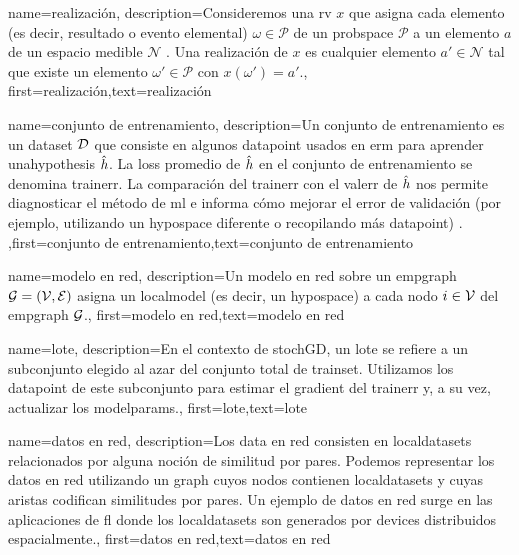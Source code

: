 	
 {name={realización},
	 description={Consideremos una \gls{rv} $x$ que asigna cada elemento 
	 (es decir, resultado o evento elemental) $\omega \in \mathcal{P}$ de un \gls{probspace} $\mathcal{P}$ 
	 a un elemento $a$ de un espacio medible $\mathcal{N}$ \cite{BillingsleyProbMeasure,RudinBookPrinciplesMatheAnalysis,HalmosMeasure}. 
	 Una realización de $x$ es cualquier elemento $a' \in \mathcal{N}$ tal que existe 
	 un elemento $\omega' \in \mathcal{P}$ con $x(\omega') = a'$.}, first={realización},text={realización}  }
 
 {name={conjunto de entrenamiento},
 description={Un conjunto de entrenamiento es un \gls{dataset} $\mathcal{D}$ que consiste en algunos \gls{datapoint} usados en \gls{erm} 
	 para aprender una\gls{hypothesis} $\hat{h}$. La \gls{loss} promedio de $\hat{h}$ en el 
	 conjunto de entrenamiento se denomina \gls{trainerr}.  La comparación del \gls{trainerr} con el 
	 \gls{valerr} de $\hat{h}$ nos permite diagnosticar el método de \gls{ml} e informa cómo mejorar 
	 el error de validación (por ejemplo, utilizando un \gls{hypospace} diferente o recopilando más \gls{datapoint}) \cite[Sec. 6.6]{MLBasics}.}
	 ,first={conjunto de entrenamiento},text={conjunto de entrenamiento}  
 }
 
 {name={modelo en red},
   description={Un modelo en red sobre un \gls{empgraph} $\mathcal{G} = \left( \mathcal{V},\mathcal{E} \right)$ asigna 
	un \gls{localmodel} (es decir, un \gls{hypospace}) a cada nodo $i \in \mathcal{V}$ del \gls{empgraph} $\mathcal{G}$.}, 
	first={modelo en red},text={modelo en red}
 }

 {
	 name={lote},
	 description={En el contexto de \gls{stochGD}, un lote se refiere a un subconjunto elegido al azar del 
	 conjunto total de \gls{trainset}. Utilizamos los \gls{datapoint} de este subconjunto 
	 para estimar el \gls{gradient} del \gls{trainerr} y, a su vez, actualizar los \gls{modelparams}.}, 
	 first={lote},text={lote}  
 }
 
 {
	 name={datos en red},
	 description={Los \gls{data} en red consisten en \gls{localdataset}s 
	 relacionados por alguna noción de similitud por pares. Podemos representar los datos en red 
	 utilizando un \gls{graph} cuyos nodos contienen \gls{localdataset}s y cuyas aristas codifican 
	 similitudes por pares. Un ejemplo de datos en red surge en las aplicaciones de \gls{fl} 
	 donde los \gls{localdataset}s  son generados por \gls{device}s distribuidos espacialmente.}, 
	 first={datos en red},text={datos en red}  
 }
 
